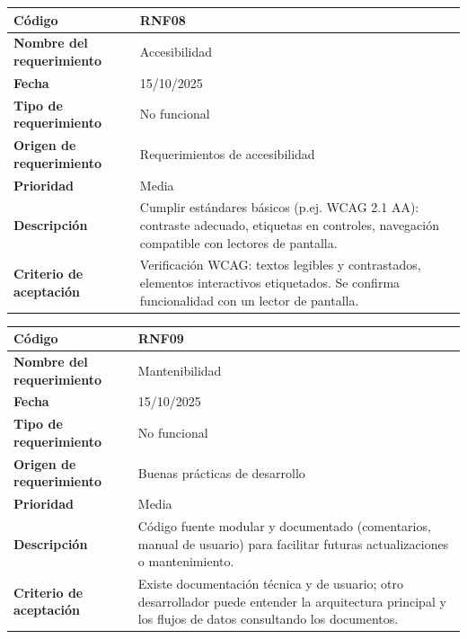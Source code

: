 \begin{table}[H]
	\begin{tabular}{|s{5cm}|m{11cm}|}
		\hline
		\textbf{Código} & RNF08 \\ \hline
		\textbf{Nombre del requerimiento} & Accesibilidad \\ \hline
		\textbf{Fecha} & 15/10/2025 \\ \hline
		\textbf{Tipo de requerimiento} & No funcional \\ \hline
		\textbf{Origen de requerimiento} & Requerimientos de accesibilidad \\ \hline
		\textbf{Prioridad} & Media \\ \hline
		\textbf{Descripción} & Cumplir estándares básicos (p.ej. WCAG 2.1 AA): contraste adecuado, etiquetas en controles, navegación compatible con lectores de pantalla. \\ \hline
		\textbf{Criterio de aceptación} & Verificación WCAG: textos legibles y contrastados, elementos interactivos etiquetados. Se confirma funcionalidad con un lector de pantalla. \\ \hline
	\end{tabular}
\end{table}

\begin{table}[H]
	\begin{tabular}{|s{5cm}|m{11cm}|}
		\hline
		\textbf{Código} & RNF09 \\ \hline
		\textbf{Nombre del requerimiento} & Mantenibilidad \\ \hline
		\textbf{Fecha} & 15/10/2025 \\ \hline
		\textbf{Tipo de requerimiento} & No funcional \\ \hline
		\textbf{Origen de requerimiento} & Buenas prácticas de desarrollo \\ \hline
		\textbf{Prioridad} & Media \\ \hline
		\textbf{Descripción} & Código fuente modular y documentado (comentarios, manual de usuario) para facilitar futuras actualizaciones o mantenimiento. \\ \hline
		\textbf{Criterio de aceptación} & Existe documentación técnica y de usuario; otro desarrollador puede entender la arquitectura principal y los flujos de datos consultando los documentos. \\ \hline
	\end{tabular}
\end{table}

